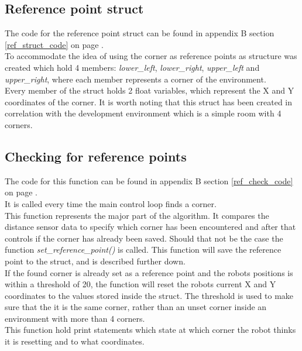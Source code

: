 \subsection{Reference point struct}
\label{ref_struct_description}
The code for the reference point struct can be found in appendix B section \ref{ref_struct_code} on page \pageref{ref_struct_code}.\\
To accommodate the idea of using the corner as reference points as structure was created which hold 4 members: \textit{lower\_left}, \textit{lower\_right}, \textit{upper\_left} and \textit{upper\_right}, where each member represents a corner of the environment. \\
Every member of the struct holds 2 float variables, which represent the X and Y coordinates of the corner.
It is worth noting that this struct has been created in correlation with the development environment which is a simple room with 4 corners.

\subsection{Checking for reference points}
\label{ref_check_description}
The code for this function can be found in appendix B section \ref{ref_check_code} on page \pageref{ref_check_code}.\\
It is called every time the main control loop finds a corner. \\
This function represents the major part of the algorithm. It compares the distance sensor data to specify which corner has been encountered and after that controls if the corner has already been saved.
Should that not be the case the function \textit{set\_reference\_point()} is called. This function will save the reference point to the struct, and is described further down. \\
If the found corner is already set as a reference point and the robots positions is within a threshold of 20, the function will reset the robots current X and Y coordinates to the values stored inside the struct. The threshold is used to make sure that the it is the same corner, rather than an unset corner inside an environment with more than 4 corners. \\
This function hold print statements which state at which corner the robot thinks it is resetting and to what coordinates. 

